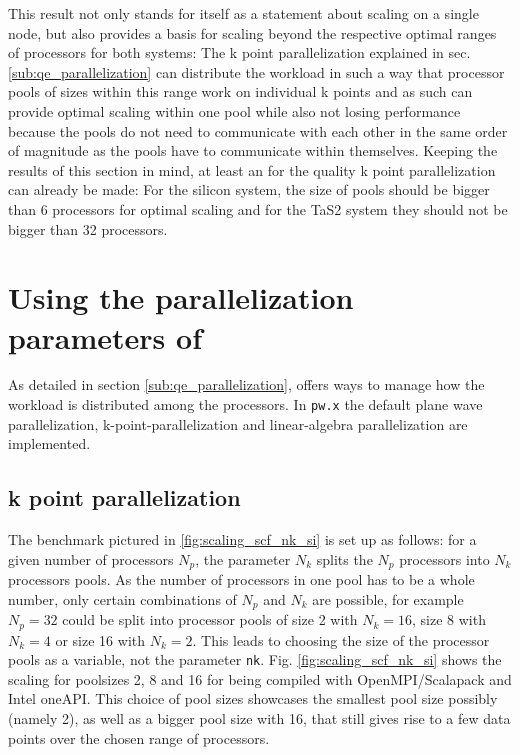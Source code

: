 \documentclass[main.tex]{subfiles}
\begin{document}

This result not only stands for itself as a statement about scaling on a single node, but also provides a basis for scaling beyond the respective optimal ranges of processors for both systems:
The k point parallelization explained in sec. \ref{sub:qe_parallelization} can distribute the workload in such a way that processor pools of sizes within this range work on individual k points and as such can provide optimal scaling within one pool while also not losing performance because the pools do not need to communicate with each other in the same order of magnitude as the pools have to communicate within themselves.
Keeping the results of this section in mind, at least an for the quality k point parallelization can already be made:
For the silicon system, the size of pools should be bigger than 6 processors for optimal scaling and for the TaS2 system they should not be bigger than 32 processors.

\section{Using the parallelization parameters of \QE}

As detailed in section \ref{sub:qe_parallelization}, \QE offers ways to manage how the workload is distributed among the processors.
In \texttt{pw.x} the default plane wave parallelization, k-point-parallelization and linear-algebra parallelization are implemented.

\subsection{k point parallelization}

The benchmark pictured in \ref{fig:scaling_scf_nk_si} is set up as follows: for a given number of processors \(N_p\), the parameter \(N_k\) splits the \(N_p\) processors into \(N_k\) processors pools.
As the number of processors in one pool has to be a whole number, only certain combinations of \(N_p\) and \(N_k\) are possible, for example \(N_p = 32\) could be split into processor pools of size 2 with \(N_k = 16\), size 8 with \(N_k = 4\) or size 16 with \(N_k = 2\).
This leads to choosing the size of the processor pools as a variable, not the parameter \texttt{nk}.
Fig. \ref{fig:scaling_scf_nk_si} shows the scaling for poolsizes 2, 8 and 16 for \QE being compiled with OpenMPI/Scalapack and Intel oneAPI.
This choice of pool sizes showcases the smallest pool size possibly (namely 2), as well as a bigger pool size with 16, that still gives rise to a few data points over the chosen range of processors.
\end{document}
